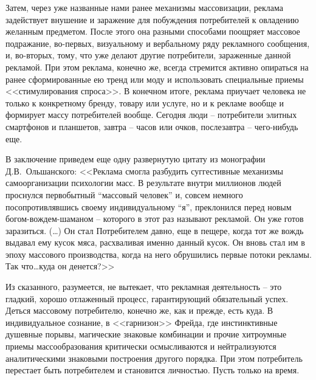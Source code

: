 Затем, через уже названные нами ранее механизмы массовизации, реклама задействует
внушение и заражение для побуждения потребителей к овладению желанным предметом.
После этого она разными способами поощряет массовое подражание, во-первых,
визуальному и вербальному ряду рекламного сообщения, и, во-вторых, тому,
что уже делают другие потребители, зараженные данной рекламой. При этом реклама,
конечно же, всегда стремится активно опираться на ранее сформированные ею тренд или
моду и использовать специальные приемы <<стимулирования спроса>>. В конечном итоге,
реклама приучает человека не только к конкретному бренду, товару или услуге,
но и к рекламе вообще и формирует массу потребителей вообще. Сегодня люди --
потребители элитных смартфонов и планшетов, завтра -- часов или очков, послезавтра --
чего-нибудь еще.

В заключение приведем еще одну развернутую цитату из монографии Д.В.~Ольшанского:
<<Реклама смогла разбудить суггестивные механизмы самоорганизации психологии масс.
В результате внутри миллионов людей проснулся первобытный ``массовый человек'' и,
совсем немного посопротивлявшись своему индивидуальному ``я'', преклонился перед
новым богом-вождем-шаманом -- которого в этот раз называют рекламой. Он уже готов
заразиться. (\ldots) Он стал Потребителем давно, еще в пещере, когда тот же вождь
выдавал ему кусок мяса, расхваливая именно данный кусок. Он вновь стал им в эпоху
массового производства, когда на него обрушились первые потоки рекламы.
Так что\ldots куда он денется?>>\autocite[][321]{book:olshansky}

Из сказанного, разумеется, не вытекает, что рекламная деятельность -- это гладкий,
хорошо отлаженный процесс, гарантирующий обязательный успех. Деться массовому
потребителю, конечно же, как и прежде, есть куда. В индивидуальное сознание,
в <<гарнизон>> Фрейда, где инстинктивные душевные порывы, магические знаковые
комбинации и прочие хитроумные приемы массообразования критически осмысливаются и
нейтрализуются аналитическими знаковыми построения другого порядка.
При этом потребитель перестает быть потребителем и становится личностью.
Пусть только на время.

